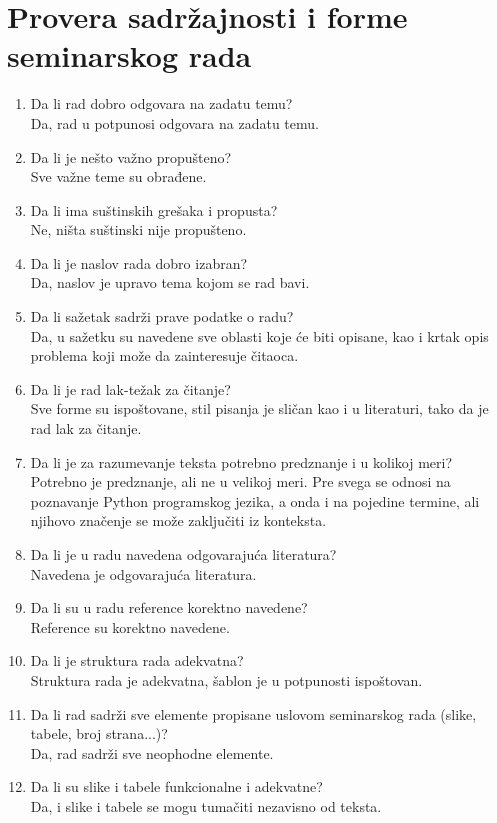 \documentclass[a4paper]{report}
\begin{document}
\section{Provera sadržajnosti i forme seminarskog rada}

\begin{enumerate}
\item Da li rad dobro odgovara na zadatu temu?\\
Da, rad u potpunosi odgovara na zadatu temu.
\item Da li je nešto važno propušteno?\\
Sve važne teme su obrađene.
\item Da li ima suštinskih grešaka i propusta?\\
Ne, ništa suštinski nije propušteno.
\item Da li je naslov rada dobro izabran?\\
Da, naslov je upravo tema kojom se rad bavi.
\item Da li sažetak sadrži prave podatke o radu?\\
Da, u sažetku su navedene sve oblasti koje će biti opisane, kao i krtak opis problema koji može da zainteresuje čitaoca.
\item Da li je rad lak-težak za čitanje?\\
Sve forme su ispoštovane, stil pisanja je sličan kao i u literaturi, tako da je rad lak za čitanje.
\item Da li je za razumevanje teksta potrebno predznanje i u kolikoj meri?\\
Potrebno je predznanje, ali ne u velikoj meri. Pre svega se odnosi na poznavanje Python programskog jezika, a onda i na pojedine termine, ali njihovo značenje se može zaključiti iz konteksta.
\item Da li je u radu navedena odgovarajuća literatura?\\
Navedena je odgovarajuća literatura.
\item Da li su u radu reference korektno navedene?\\
Reference su korektno navedene.
\item Da li je struktura rada adekvatna?\\
Struktura rada je adekvatna, šablon je u potpunosti ispoštovan.
\item Da li rad sadrži sve elemente propisane uslovom seminarskog rada (slike, tabele, broj strana...)?\\
Da, rad sadrži sve neophodne elemente.
\item Da li su slike i tabele funkcionalne i adekvatne?\\
Da, i slike i tabele se mogu tumačiti nezavisno od teksta.
\end{enumerate}
\end{document}
